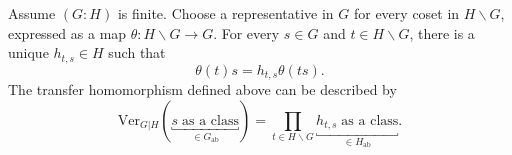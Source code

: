 \begin{proposition}
	Assume $(G:H)$ is finite. Choose a representative in $G$ for every coset
	in $H\backslash G$, expressed as a map $\theta:H\backslash G\to G$. For
	every $s\in G$ and $t\in H\backslash G$, there is a unique
	$h_{t,s}\in H$ such that
	\[ \theta(t)s = h_{t, s} \theta(ts). \]
	The transfer homomorphism defined above can be described by
	\[ \mathrm{Ver}_{G|H}(\underbracket{s\;\text{as a class}}_{\in G_{\mathrm{ab}}}) = \prod_{t \in H \backslash G} \underbracket{h_{t, s}\;\text{as a class}}_{\in H_{\mathrm{ab}}}. \]
\end{proposition}
